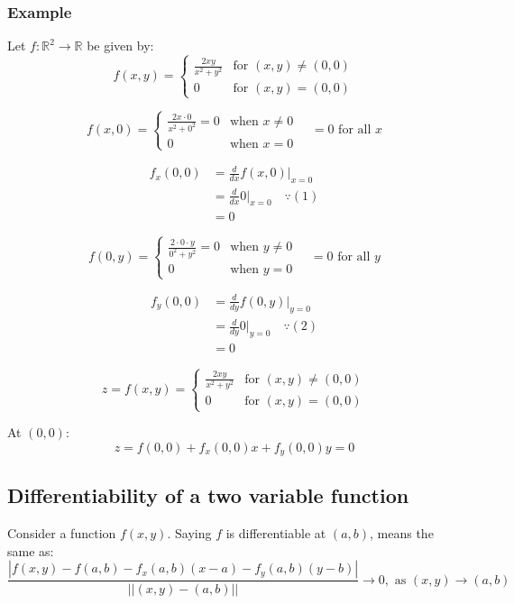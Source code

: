 \documentclass[11pt]{article}
\begin{document}
\subsubsection{Example}
\label{sec:org6e40bd7}
Let \(f : \mathbb{R}^2 \rightarrow \mathbb{R}\) be given by:
\[
f(x, y) = \begin{cases}
\frac{2xy}{x^2 + y^2} & \text{for } (x, y) \ne (0, 0) \\
0 & \text{for } (x, y) = (0, 0)
\end{cases}
\]

\[
f(x, 0) = \begin{cases}
\frac{2x \cdot 0}{x^2 + 0^2} = 0 & \text{when } x \ne 0 \\
0 & \text{when } x = 0
\end{cases}
\quad = 0 \text{ for all } x \tag{1}
\]

\begin{align*}
f_x(0, 0) &= \frac{d}{dx} f(x, 0)|_{x = 0} \\
&= \frac{d}{dx} 0|_{x = 0} \quad \because (1) \\
&= 0
\end{align*}

\[
f(0, y) = \begin{cases}
\frac{2 \cdot 0 \cdot y}{0^2 + y^2} = 0 & \text{when } y \ne 0 \\
0 & \text{when } y = 0
\end{cases}
\quad = 0 \text{ for all } y \tag{2}
\]

\begin{align*}
f_y(0, 0) &= \frac{d}{dy} f(0, y)|_{y = 0} \\
&= \frac{d}{dy} 0|_{y = 0} \quad \because (2) \\
&= 0
\end{align*}

\[
z = f(x, y) = \begin{cases}
\frac{2xy}{x^2 + y^2} & \text{for } (x, y) \ne (0, 0) \\
0 & \text{for } (x, y) = (0, 0)
\end{cases}
\]

At \((0, 0)\):
\[z = f(0, 0) + f_x(0, 0)x + f_y(0, 0)y = 0\]
\subsection{Differentiability of a two variable function}
\label{sec:org62a4ab2}
Consider a function \(f(x, y)\). Saying \(f\) is differentiable at \((a, b)\), means the same as:
\[\frac{|f(x, y) - f(a, b) - f_x(a, b) (x - a) - f_y(a, b) (y - b)|}{||(x, y) - (a, b)||} \rightarrow 0, \text{ as } (x, y) \rightarrow (a, b)\]
\end{document}
